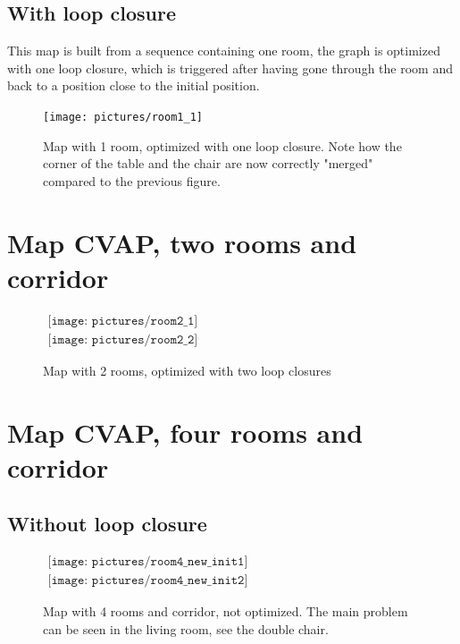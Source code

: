 \subsection{With loop closure}
This map is built from a sequence containing one room, the graph is optimized with one loop closure, which is triggered after having gone through the room and back to a position close to the initial position. 

\begin{figure}[H]
\centering
\texttt{[image: pictures/room1\_1]}
\caption{Map with 1 room, optimized with one loop closure. Note how the corner of the table and the chair are now correctly "merged" compared to the previous figure.}
\end{figure}

\section{Map CVAP, two rooms and corridor}

\begin{figure}[H]
\centering$
 \begin{array}{c}
 \texttt{[image: pictures/room2\_1]}\\
 \texttt{[image: pictures/room2\_2]}
 \end{array}$
\caption{Map with 2 rooms, optimized with two loop closures}
\end{figure}

\section{Map CVAP, four rooms and corridor}

\subsection{Without loop closure}

\begin{figure}[H]
\centering$
 \begin{array}{c}
 \texttt{[image: pictures/room4\_new\_init1]}\\
 \texttt{[image: pictures/room4\_new\_init2]}
 \end{array}$
\caption{Map with 4 rooms and corridor, not optimized. The main problem can be seen in the living room, see the double chair.}
\end{figure}

